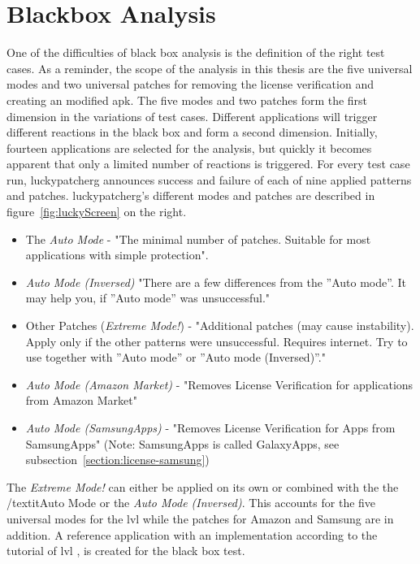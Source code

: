 \section{Blackbox Analysis} \label{section:luckypatcher-blackbox}
One of the difficulties of black box analysis is the definition of the right test cases.
As a reminder, the scope of the analysis in this thesis are the five universal modes and two universal patches for removing the license verification and creating an modified \gls{apk}.
The five modes and two patches form the first dimension in the variations of test cases.
Different applications will trigger different reactions in the black box and form a second dimension.
\newline
Initially, fourteen applications are selected for the analysis, but quickly it becomes apparent that only a limited number of reactions is triggered.
For every test case run, \gls{luckypatcherg} announces success and failure of each of nine applied patterns and patches.
\newline
\gls{luckypatcherg}’s different modes and patches are described in figure~\ref{fig:luckyScreen} on the right.
\begin{itemize}
\item The \textit{Auto Mode} - "The minimal number of patches. Suitable for most applications with simple protection".
\item \textit{Auto Mode (Inversed)} "There are a few differences from the ”Auto mode”. It may help you, if ”Auto mode” was unsuccessful."
\item Other Patches (\textit{Extreme Mode!}) - "Additional patches (may cause instability). Apply only if the other patterns were unsuccessful. Requires internet. Try to use together with ”Auto mode” or ”Auto mode (Inversed)”."
\item \textit{Auto Mode (Amazon Market)} - "Removes License Verification for applications from Amazon Market"
\item \textit{Auto Mode (SamsungApps)} - "Removes License Verification for Apps from SamsungApps" (Note: SamsungApps is called GalaxyApps, see subsection~\ref{section:license-samsung})
\end{itemize}
The \textit{Extreme Mode!} can either be applied on its own or combined with the the /textit{Auto Mode} or the \textit{Auto Mode (Inversed)}.
This accounts for the five universal modes for the \gls{lvl} while the patches for Amazon and Samsung are in addition.
\newline
A reference application with an implementation according to the tutorial of \gls{lvl} \cite{developersLicensingAdding}, is created for the black box test.
